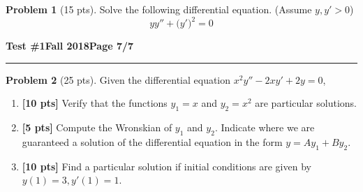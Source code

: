 \documentclass[12pt]{article}
\theoremstyle{definition}
\newtheorem{problem}{Problem}
\begin{document}
\begin{problem}[15 pts]
  Solve the following differential equation. (Assume $y,y'>0$)
  \begin{equation*}
    y y'' + \big(y'\big)^2=0
  \end{equation*}

  \vspace{10cm}
  \begin{flushright}
  \end{flushright}
\end{problem}
\newpage

\hfill{\large\bf Test \#1}\hfill{\large\bf Fall 2018}\hfill{\large\bf Page 7/7}\hrule

\bigskip

\begin{problem}[25 pts]
  Given the differential equation $x^2y''-2xy'+2y=0$,
  \begin{enumerate}
  \item \textbf{[10 pts]} Verify that the functions $y_1=x$ and $y_2 = x^2$ are particular solutions.
  \item \textbf{[5 pts]} Compute the Wronskian of $y_1$ and $y_2$.  Indicate where we are guaranteed a solution of the
    differential equation in the form $y=Ay_1 + By_2$.
  \item \textbf{[10 pts]} Find a particular solution if initial conditions are given by $y(1)=3, y'(1)=1$.

  \end{enumerate}
\end{problem}
\end{document}
